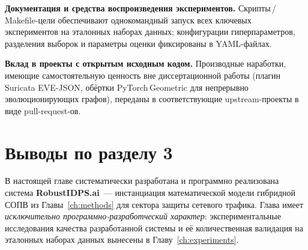 \textbf{Документация и средства воспроизведения экспериментов.}
Скрипты\,/\,Makefile-цели обеспечивают однокомандный запуск всех
ключевых экспериментов на эталонных наборах данных; конфигурации
гиперпараметров, разделения выборок и параметры оценки фиксированы в
YAML-файлах.

\textbf{Вклад в проекты с открытым исходным кодом.} Производные
наработки, имеющие самостоятельную ценность вне диссертационной работы
(плагин Suricata EVE-JSON, обёртки PyTorch\,Geometric для непрерывно
эволюционирующих графов), переданы в соответствующие upstream-проекты
в виде pull-request-ов.

\section{Выводы по разделу 3}
\label{sec:ch3_summary}

В настоящей главе систематически разработана и программно
реализована система \textbf{RobustIDPS.ai}~--- инстанциация
математической модели гибридной СОПВ из Главы~\ref{ch:methods}
для сектора защиты сетевого трафика. Глава имеет \emph{исключительно
программно-разработческий характер}: экспериментальные исследования
качества разработанной системы и её количественная валидация на
эталонных наборах данных вынесены в Главу~\ref{ch:experiments}.

